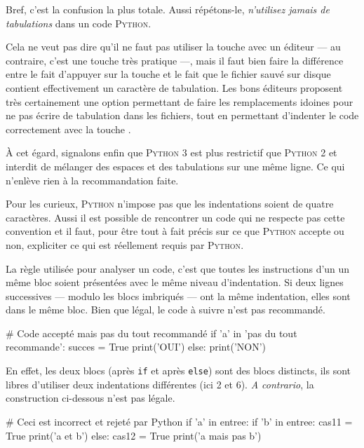 Bref, c'est la confusion la plus totale. Aussi répétons-le, \emph{n'utilisez jamais de tabulations } dans un code \textsc{Python}.

Cela ne veut pas dire qu'il ne faut pas utiliser la touche  avec un éditeur --- au contraire, c'est une touche très pratique ---, mais il faut bien faire la différence entre le fait d'appuyer sur la touche  et le fait que le fichier sauvé sur disque contient effectivement un caractère de tabulation. Les bons éditeurs proposent très certainement une option permettant de faire les remplacements idoines pour ne pas écrire de tabulation dans les fichiers, tout en permettant d'indenter le code correctement avec la touche .

À cet égard, signalons enfin que \textsc{Python} 3 est plus restrictif que \textsc{Python} 2 et interdit de mélanger des espaces et des tabulations sur une même ligne. Ce qui n'enlève rien à la recommandation faite.


Pour les curieux, \textsc{Python} n'impose pas que les indentations soient de quatre caractères. Aussi il est possible de rencontrer un code qui ne respecte pas cette convention et il faut, pour être tout à fait précis sur ce que \textsc{Python} accepte ou non, expliciter ce qui est réellement requis par \textsc{Python}.

La règle utilisée pour analyser un code, c'est que toutes les instructions d'un un même bloc soient présentées avec le même niveau d'indentation. Si deux lignes successives --- modulo les blocs imbriqués --- ont la même indentation, elles sont dans le même bloc.
Bien que légal, le code à suivre n'est pas recommandé.

\begin{idleconsole}
\begin{pyconsole}
# Code accepté mais pas du tout recommandé
if 'a' in 'pas du tout recommande':
  succes = True
  print('OUI')
else:
      print('NON')

\end{pyconsole}
\end{idleconsole}

En effet, les deux blocs (après \texttt{if} et après \texttt{else}) sont des blocs distincts, ils sont libres d'utiliser deux indentations différentes (ici 2 et 6). \textit{A contrario}, la construction ci-dessous n'est pas légale.

\begin{idleconsole}
\begin{pyconsole}
# Ceci est incorrect et rejeté par Python
if 'a' in entree:
    if 'b' in entree:
        cas11 = True
        print('a et b')
      else:
        cas12 = True
        print('a mais pas b')

\end{pyconsole}
\end{idleconsole}


